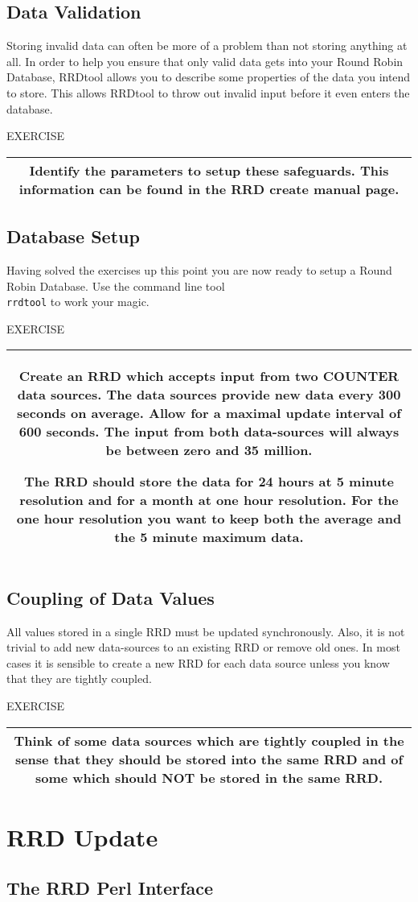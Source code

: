 \documentclass[a4paper,12pt]{article}
\newenvironment{work}{\textsf{\tiny EXERCISE}\nopagebreak\\[0.3ex]\begin{tabular}{|c|}
 \hline
 \begin{minipage}{0.965\linewidth}%
 \setlength{\parskip}{1.6ex plus 0.6ex minus 0.4ex}%
 \rule{0pt}{2.8ex}\ignorespaces}
{\rule[-1.8ex]{0pt}{0pt}\end{minipage}\\
 \hline
 \end{tabular}}
\newcommand{\ex}[1]{\subsection{#1}}
\newcommand{\cmd}[1]{\texttt{\mbox{#1}}}
\begin{document}
\ex{Data Validation}

Storing invalid data can often be more of a problem than not storing
anything at all. In order to help you ensure that only valid data gets
into your Round Robin Database, RRDtool allows you to
describe some properties of the data you intend to store. This allows
RRDtool to throw out invalid input before it even enters the database.

\begin{work}
Identify the parameters to setup these safeguards. This information
can be found in the RRD create manual page.\end{work}

\ex{Database Setup}

Having solved the exercises up this point you are now ready to setup a
Round Robin Database. Use the command line tool\\
\cmd{rrdtool} to work your magic. 

\begin{work}
  Create an RRD which accepts input from two COUNTER
  data sources. The data sources provide new data every 300 seconds on
  average. Allow for a maximal update interval of 600 seconds. The
  input from both data-sources will always be between zero and 35
  million.
  
  The RRD should store the data for 24 hours at 5 minute resolution
  and for a month at one hour resolution. For the one hour resolution
  you want to keep both the average and the 5 minute maximum data.
\end{work}

\ex{Coupling of Data Values}

All values stored in a single RRD must be updated synchronously. Also,
it is not trivial to add new data-sources to an existing RRD or remove
old ones. In most cases it is sensible to create a new RRD for each
data source unless you know that they are tightly coupled.

\begin{work}
  Think of some data sources which are tightly coupled in the sense that
  they should be stored into the same RRD and of some which should NOT be
  stored in the same RRD.
\end{work}

\section{RRD Update}
\ex{The RRD Perl Interface}
\end{document}

